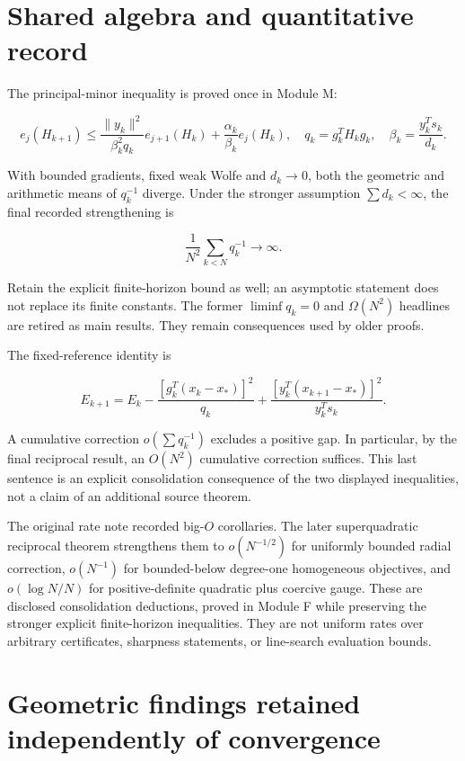 \section{Shared algebra and quantitative record}\label{shared-algebra-and-quantitative-record}

The principal-minor inequality is proved once in Module M:

\[e_j(H_{k+1})\le
\frac{\|y_k\|^2}{\beta_k^2q_k}e_{j+1}(H_k)
+\frac{\alpha_k}{\beta_k}e_j(H_k),\quad
q_k=g_k^TH_kg_k,\quad\beta_k=\frac{y_k^Ts_k}{d_k}.\]

With bounded gradients, fixed weak Wolfe and \(d_k\to0\), both the geometric and arithmetic means of \(q_k^{-1}\) diverge. Under the stronger assumption \(\sum d_k<\infty\), the final recorded strengthening is

\[\boxed{\frac1{N^2}\sum_{k<N}q_k^{-1}\to\infty.}\]

Retain the explicit finite-horizon bound as well; an asymptotic statement does not replace its finite constants. The former \(\liminf q_k=0\) and \(\Omega(N^2)\) headlines are retired as main results. They remain consequences used by older proofs.

The fixed-reference identity is

\[E_{k+1}=E_k-\frac{[g_k^T(x_k-x_*)]^2}{q_k}
+\frac{[y_k^T(x_{k+1}-x_*)]^2}{y_k^Ts_k}.\]

A cumulative correction \(o(\sum q_k^{-1})\) excludes a positive gap. In particular, by the final reciprocal result, an \(O(N^2)\) cumulative correction suffices. This last sentence is an explicit consolidation consequence of the two displayed inequalities, not a claim of an additional source theorem.

The original rate note recorded big-\(O\) corollaries. The later superquadratic reciprocal theorem strengthens them to \(o(N^{-1/2})\) for uniformly bounded radial correction, \(o(N^{-1})\) for bounded-below degree-one homogeneous objectives, and \(o(\log N/N)\) for positive-definite quadratic plus coercive gauge. These are disclosed consolidation deductions, proved in Module F while preserving the stronger explicit finite-horizon inequalities. They are not uniform rates over arbitrary certificates, sharpness statements, or line-search evaluation bounds.

\section{Geometric findings retained independently of convergence}\label{geometric-findings-retained-independently-of-convergence}

